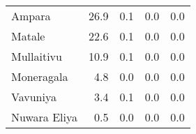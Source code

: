 \begin{tabular}{lrrrr}
Ampara       &           26.9 &                 0.1 &            0.0 &                 0.0 \\
Matale       &           22.6 &                 0.1 &            0.0 &                 0.0 \\
Mullaitivu   &           10.9 &                 0.1 &            0.0 &                 0.0 \\
Moneragala   &            4.8 &                 0.0 &            0.0 &                 0.0 \\
Vavuniya     &            3.4 &                 0.1 &            0.0 &                 0.0 \\
Nuwara Eliya &            0.5 &                 0.0 &            0.0 &                 0.0 \\
\bottomrule
\end{tabular}
